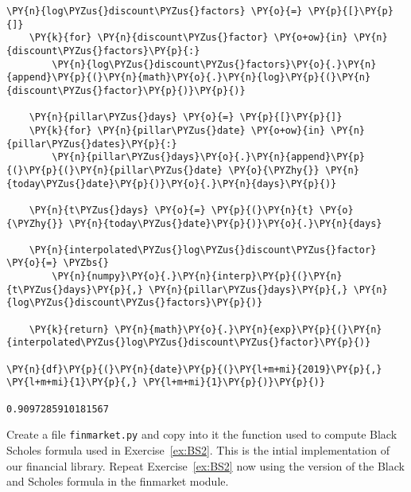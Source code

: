 \begin{Answer}
\begin{tcolorbox}[size=fbox, boxrule=1pt, colback=cellbackground, colframe=cellborder]
\begin{Verbatim}[commandchars=\\\{\}]
    \PY{n}{log\PYZus{}discount\PYZus{}factors} \PY{o}{=} \PY{p}{[}\PY{p}{]}
    \PY{k}{for} \PY{n}{discount\PYZus{}factor} \PY{o+ow}{in} \PY{n}{discount\PYZus{}factors}\PY{p}{:}
        \PY{n}{log\PYZus{}discount\PYZus{}factors}\PY{o}{.}\PY{n}{append}\PY{p}{(}\PY{n}{math}\PY{o}{.}\PY{n}{log}\PY{p}{(}\PY{n}{discount\PYZus{}factor}\PY{p}{)}\PY{p}{)}
    
    \PY{n}{pillar\PYZus{}days} \PY{o}{=} \PY{p}{[}\PY{p}{]}
    \PY{k}{for} \PY{n}{pillar\PYZus{}date} \PY{o+ow}{in} \PY{n}{pillar\PYZus{}dates}\PY{p}{:}
        \PY{n}{pillar\PYZus{}days}\PY{o}{.}\PY{n}{append}\PY{p}{(}\PY{p}{(}\PY{n}{pillar\PYZus{}date} \PY{o}{\PYZhy{}} \PY{n}{today\PYZus{}date}\PY{p}{)}\PY{o}{.}\PY{n}{days}\PY{p}{)}
    
    \PY{n}{t\PYZus{}days} \PY{o}{=} \PY{p}{(}\PY{n}{t} \PY{o}{\PYZhy{}} \PY{n}{today\PYZus{}date}\PY{p}{)}\PY{o}{.}\PY{n}{days}
    
    \PY{n}{interpolated\PYZus{}log\PYZus{}discount\PYZus{}factor} \PY{o}{=} \PYZbs{}
        \PY{n}{numpy}\PY{o}{.}\PY{n}{interp}\PY{p}{(}\PY{n}{t\PYZus{}days}\PY{p}{,} \PY{n}{pillar\PYZus{}days}\PY{p}{,} \PY{n}{log\PYZus{}discount\PYZus{}factors}\PY{p}{)}
    
    \PY{k}{return} \PY{n}{math}\PY{o}{.}\PY{n}{exp}\PY{p}{(}\PY{n}{interpolated\PYZus{}log\PYZus{}discount\PYZus{}factor}\PY{p}{)}

\PY{n}{df}\PY{p}{(}\PY{n}{date}\PY{p}{(}\PY{l+m+mi}{2019}\PY{p}{,} \PY{l+m+mi}{1}\PY{p}{,} \PY{l+m+mi}{1}\PY{p}{)}\PY{p}{)}

0.9097285910181567
\end{Verbatim}
\end{tcolorbox} 
\end{Answer}

\begin{Exercise}[label={ex:BS3}]
Create a file \texttt{finmarket.py} and copy into it the function used to compute Black Scholes formula used in Exercise~\ref{ex:BS2}. This is the intial implementation of our financial library. Repeat Exercise~\ref{ex:BS2} now using the version of the Black and Scholes formula in the finmarket module.
\end{Exercise}

